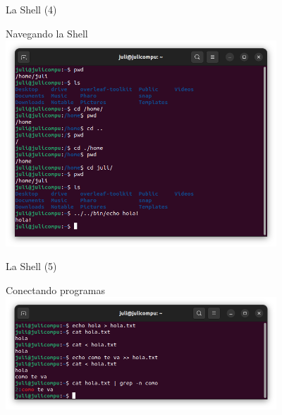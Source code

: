 \begin{frame}{La Shell (4)}
\begin{block}{Navegando la Shell}
        \vspace{-0.3cm}
        \centering
        \includegraphics[width=4in]{images/bash-3.png}
\end{block}
\end{frame}

\begin{frame}{La Shell (5)}
\begin{block}{Conectando programas}
        \centering
        \includegraphics[width=4in]{images/bash-4.png}
\end{block}
\end{frame}

